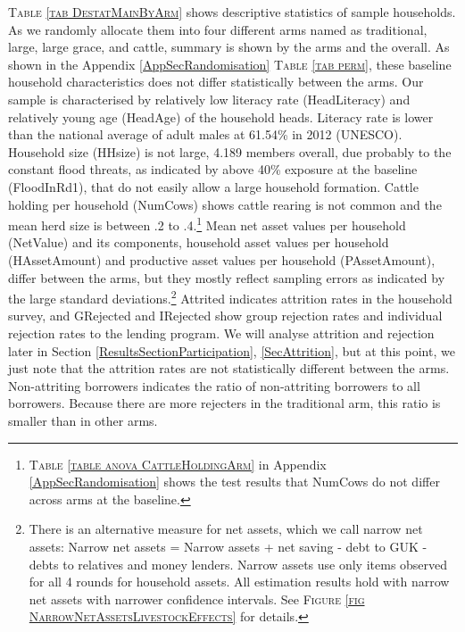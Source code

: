 	\textsc{\small Table \ref{tab DestatMainByArm}} shows descriptive statistics of sample households. As we randomly allocate them into four different arms named as \textsf{traditional}, \textsf{large}, \textsf{large grace}, and \textsf{cattle}, summary is shown by the arms and the overall. As shown in the Appendix \ref{AppSecRandomisation} \textsc{\normalsize Table \ref{tab perm}}, these baseline household characteristics does not differ statistically between the arms. Our sample is characterised by relatively low literacy rate (\textsf{HeadLiteracy}) and relatively young age (\textsf{HeadAge}) of the household heads. Literacy rate is lower than the national average of adult males at 61.54\% in 2012 (UNESCO). Household size (\textsf{HHsize}) is not large, 4.189 members overall, due probably to the constant flood threats, as indicated by above 40\% exposure at the baseline (\textsf{FloodInRd1}), that do not easily allow a large household formation. Cattle holding per household (\textsf{NumCows}) shows cattle rearing is not common and the mean herd size is between .2 to .4.\footnote{ \textsc{Table \ref{table anova CattleHoldingArm}} in Appendix \ref{AppSecRandomisation} shows the test results that \textsf{NumCows} do not differ across arms at the baseline. } Mean net asset values per household (\textsf{NetValue}) and its components, household asset values per household (\textsf{HAssetAmount}) and productive asset values per household (\textsf{PAssetAmount}), differ between the arms, but they mostly reflect sampling errors as indicated by the large standard deviations.\footnote{There is an alternative measure for net assets, which we call narrow net assets: Narrow net assets = Narrow assets + net saving - debt to GUK - debts to relatives and money lenders. Narrow assets use only items observed for all 4 rounds for household assets. All estimation results hold with narrow net assets with narrower confidence intervals. See \textsc{\footnotesize Figure \ref{fig NarrowNetAssetsLivestockEffects}} for details. } \textsf{Attrited} indicates attrition rates in the household survey, and \textsf{GRejected} and \textsf{IRejected} show group rejection rates and individual rejection rates to the lending program. We will analyse attrition and rejection later in Section \ref{ResultsSectionParticipation}, \ref{SecAttrition}, but at this point, we just note that the attrition rates are not statistically different between the arms. \textsf{Non-attriting borrowers} indicates the ratio of non-attriting borrowers to all borrowers. Because there are more rejecters in the \textsf{traditional} arm, this ratio is smaller than in other arms. 



